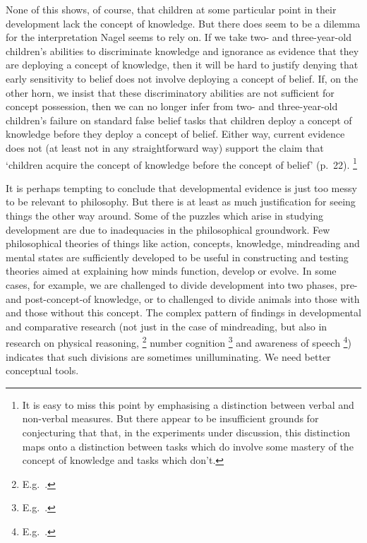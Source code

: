 \documentclass[12pt,\papersize]{extarticle}
\begin{document}
None of this shows, of course, that children at some particular point in their development lack the concept of knowledge.
But there does seem to be a dilemma for the interpretation  Nagel seems to rely on.
If we take two- and three-year-old children's abilities to discriminate knowledge and ignorance as evidence that they are deploying a concept of knowledge,
then it will be hard to justify denying that early sensitivity to belief does not involve deploying a concept of belief.
If, on the other horn, we insist that these discriminatory abilities are not sufficient for concept possession,
then we can no longer infer from two- and three-year-old children's failure on standard false belief tasks that  children deploy a concept of knowledge before they deploy a concept of belief.
Either way, current evidence does not 
(at least not in any straightforward way)
support the claim that `children acquire the concept of knowledge before the concept of belief' (p.\ 22).%
\footnote{
It is easy to miss this point by emphasising a distinction between verbal and non-verbal measures.
But there appear to be insufficient grounds for conjecturing that that, in the experiments under discussion, 
this distinction maps onto a distinction between 
tasks which do involve some mastery of the concept of knowledge
and
tasks which don't.
}

It is perhaps tempting to conclude that developmental evidence is just too messy to be relevant to philosophy.
But there is at least as much justification for seeing things the other way around.
Some of the puzzles which arise in studying development are due to inadequacies in the philosophical groundwork.
Few philosophical theories of things like action, concepts, knowledge, mindreading and mental states are sufficiently developed to be useful in constructing and testing theories aimed at explaining 
 how minds function, develop or evolve.
In some cases, for example, we are challenged to divide development into two phases, pre- and post-concept-of knowledge, or to challenged to divide animals into those with and those without this concept.
The complex pattern of findings in developmental and comparative research (not just in the case of mindreading, but also in research on physical reasoning,%
\footnote{
E.g.\ \citet{Berthier:2000eu,Baillargeon:2002hb,Hood:2003yg}.
}
number cognition%
\footnote{
E.g.\ \citet{Xu:2003qw,feigenson_limits_2005,gallistel_non-verbal_2000,gelman_number_2005}.
}
and awareness of speech%
\footnote{
E.g.\ \citet{Eimas:1971cp,Jusczyk:1995it,Anthony:2004yp,Liberman:1990mo}.
}) 
indicates that such divisions are sometimes unilluminating.
We need better conceptual tools.
\end{document}
